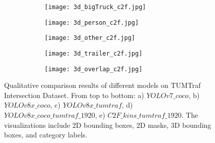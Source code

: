 \begin{figure}
	\begin{comment}
		\begin{subfigure}{\textwidth}
			\centering
			\begin{subfigure}{0.25\textwidth}
				\texttt{[image: place\_holder.jpg]}
			\end{subfigure}\hfill
			\begin{subfigure}{0.25\textwidth}
				\texttt{[image: place\_holder.jpg]}
			\end{subfigure}\hfill
			\begin{subfigure}{0.25\textwidth}
				\texttt{[image: place\_holder.jpg]}
			\end{subfigure}\hfill
			\begin{subfigure}{0.25\textwidth}
				\texttt{[image: place\_holder.jpg]}
			\end{subfigure}
			\vspace{-\baselineskip}
		\end{subfigure}
	\end{comment}
	
	\begin{subfigure}{\textwidth}
		\centering
		\begin{subfigure}{0.2\textwidth}
			\texttt{[image: 3d\_bigTruck\_c2f.jpg]}
		\end{subfigure}\hfill
		\begin{subfigure}{0.2\textwidth}
			\texttt{[image: 3d\_person\_c2f.jpg]}
		\end{subfigure}\hfill
		\begin{subfigure}{0.2\textwidth}
			\texttt{[image: 3d\_other\_c2f.jpg]}
		\end{subfigure}\hfill
		\begin{subfigure}{0.2\textwidth}
			\texttt{[image: 3d\_trailer\_c2f.jpg]}
		\end{subfigure}\hfill
		\begin{subfigure}{0.2\textwidth}
			\texttt{[image: 3d\_overlap\_c2f.jpg]}
		\end{subfigure}
		\vspace{-\baselineskip}
	\end{subfigure}
	
	\caption{Qualitative comparison results of different models on TUMTraf Intersection Dataset. From top to bottom: a) $YOLOv7\_coco$, b) $YOLOv8x\_coco$, c) $YOLOv8x\_tumtraf$, d) $YOLOv8x\_coco\_tumtraf\_1920$, e) $C2F\_kins\_tumtraf\_1920$. The visualizations include 2D bounding boxes, 2D masks, 3D bounding boxes, and category labels.}
	\label{fig:qualitative_result}
\end{figure}


